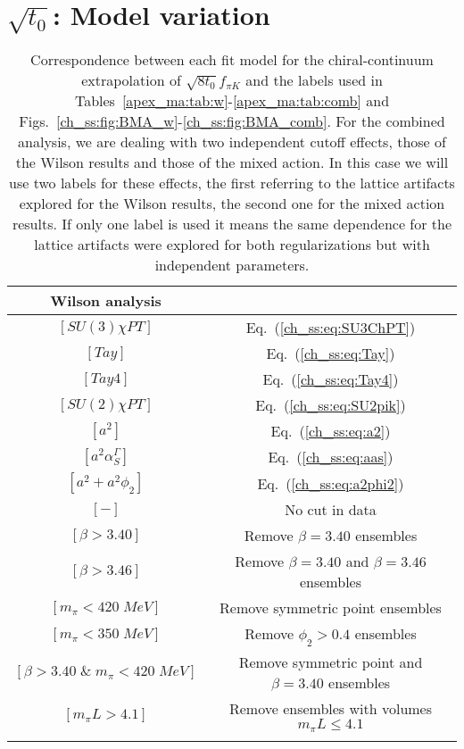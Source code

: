 
\chapter{$\sqrt{t_0}$: Model variation}
\label{apex_model_av_t0}


\begin{longtable}{c | c}
\label{apex_ma:tab:labels}
Wilson analysis \\
\toprule
$[SU(3)\chi PT]$ & Eq.~(\ref{ch_ss:eq:SU3ChPT}) \\
$[Tay]$ & Eq.~(\ref{ch_ss:eq:Tay}) \\
$[Tay4]$ & Eq.~(\ref{ch_ss:eq:Tay4}) \\
$[SU(2)\chi PT]$ & Eq.~(\ref{ch_ss:eq:SU2pik}) \\
\midrule
$[a^2]$ & Eq.~(\ref{ch_ss:eq:a2}) \\
$[a^2\alpha_S^{\Gamma}]$ & Eq.~(\ref{ch_ss:eq:aas}) \\
$[a^2+a^2\phi_2]$ & Eq.~(\ref{ch_ss:eq:a2phi2}) \\
\midrule
$[-]$ & No cut in data \\
$[\beta>3.40]$ & Remove $\beta=3.40$ ensembles \\
$[\beta>3.46]$ & Remove $\beta=3.40$ and $\beta=3.46$ ensembles \\
$[m_{\pi}<420\;MeV]$ & Remove symmetric point ensembles \\
$[m_{\pi}<350\;MeV]$ & Remove $\phi_2>0.4$ ensembles \\
$[\beta>3.40\;\&\;m_{\pi}<420\;MeV]$ & Remove symmetric point and $\beta=3.40$ ensembles \\
$[m_{\pi}L>4.1]$ & Remove ensembles with volumes $m_{\pi}L\leq4.1$ \\
\bottomrule
\caption{Correspondence between each fit model for the chiral-continuum extrapolation of $\sqrt{8t_0}f_{\pi K}$ and the labels used in Tables~\ref{apex_ma:tab:w}-\ref{apex_ma:tab:comb} and Figs.~\ref{ch_ss:fig:BMA_w}-\ref{ch_ss:fig:BMA_comb}. For the combined analysis, we are dealing with two independent cutoff effects, those of the Wilson results and those of the mixed action. In this case we will use two labels for these effects, the first referring to the lattice artifacts explored for the Wilson results, the second one for the mixed action results. If only one label is used it means the same dependence for the lattice artifacts were explored for both regularizations but with independent parameters.}
\end{longtable}

